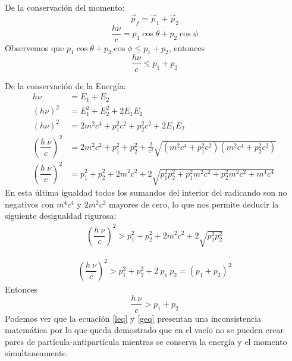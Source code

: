 \documentclass{beamer}
\begin{document}
\begin{frame}{}
    De la conservaci\'on del momento:
    \begin{equation}
        \Vec{p}_f = \Vec{p}_1 + \Vec{p}_2
    \end{equation}
    \begin{equation}
        \frac{h\nu}{c} = p_1\cos{\theta} + p_2\cos{\phi}
    \end{equation}
    Observemos que $ p_1\cos{\theta} + p_2\cos{\phi} \leq p_1 + p_2 $, entonces
    \begin{equation}\label{leq}
    \boxed{
        \frac{h\nu}{c} \leq p_1 + p_2
        }
    \end{equation}
\end{frame}{}
\begin{frame}{}
    De la conservaci\'on de la Energ\'ia:
    \begin{equation*}
        \begin{split}
            h\nu &= E_1 + E_2\\
            (h\nu)^2 &= E^2_1 + E^2_2 + 2E_1E_2\\
            (h\nu)^2 &= 2m^2c^4 + p^2_1c^2 + p^2_2c^2 + 2E_1E_2\\
            \left (\dfrac{h \ \nu}{c}\right )^2 &= 2m^2c^2 + p^2_1 + p^2_2 + \frac{2}{c^2}\sqrt{(m^2c^4 + p^2_1c^2)(m^2c^4 + p^2_2c^2)}\\
            \left (\dfrac{h \ \nu}{c}\right )^2 &= p_1^2 + p_2^2 + 2 m^2c^2 + 2\sqrt{p_1^2 p_2^2+p_1^2 m^2 c^2+p_2^2 m^2 c^2+m^4 c^4}
        \end{split}
    \end{equation*}
    En esta \'ultima igualdad todos los sumandos del interior del radicando son no negativos con $m^4c^4$ y $2m^2c^2$ mayores de cero, lo que nos permite deducir la siguiente desigualdad rigurosa:
    \begin{equation*}
        \begin{split}
            \left (\dfrac{h \ \nu}{c}\right )^2 > p_1^2 + p_2^2 + 2 m^2c^2 + 2\sqrt{p_1^2 p_2^2}
        \end{split}
    \end{equation*}
\end{frame}{}
\begin{frame}{}
        \begin{equation*}
        \begin{split}
            \left (\dfrac{h \ \nu}{c}\right )^2 > p_1^2 + p_2^2 + 2 \ p_1 \ p_2 = (p_1 + p_2)^2
        \end{split}
    \end{equation*}
    Entonces
        \begin{equation}\label{geq}
        \boxed{
        \dfrac{h \ \nu}{c} > p_1 + p_2
        }
    \end{equation}
    Podemos ver que la ecuaci\'on \eqref{leq} y \eqref{geq} presentan una inconsistencia matem\'atica por lo que queda demostrado que en el vac\'io no se pueden crear pares de part\'icula-antipart\'icula mientras se conserva la energ\'ia y el momento simultaneamente.
\end{frame}{}
\end{document}
